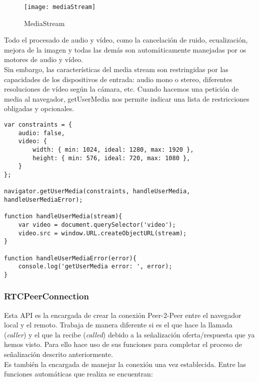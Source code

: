 \begin{figure}[htb]
\centering
\texttt{[image: mediaStream]}
\caption{MediaStream}
\label{fig:mediaStream}
\end{figure}

Todo el procesado de audio y vídeo, como la cancelación de ruido, ecualización, mejora de la imagen y todas las demás son automáticamente manejadas por os motores de audio y vídeo.\\

Sin embargo, las características del media stream son restringidas por las capacidades de los dispositivos de entrada: audio mono o stereo, diferentes resoluciones de vídeo según la cámara, etc. Cuando hacemos una petición de media al navegador, getUserMedia nos permite indicar una lista de restricciones obligadas y opcionales.\\

\begin{lstlisting}[caption=Llamada a función RTCPeerConnection]
var constraints = {
    audio: false,
    video: {
        width: { min: 1024, ideal: 1280, max: 1920 },
        height: { min: 576, ideal: 720, max: 1080 },
    }
};

navigator.getUserMedia(constraints, handleUserMedia, handleUserMediaError); 

function handleUserMedia(stream){
    var video = document.querySelector('video');
    video.src = window.URL.createObjectURL(stream);
}

function handleUserMediaError(error){
	console.log('getUserMedia error: ', error);
}

\end{lstlisting}

\subsubsection{RTCPeerConnection}

Esta API es la encargada de crear la conexión Peer-2-Peer entre el navegador local y el remoto. Trabaja de manera diferente si es el que hace la llamada (\textit{caller}) y el que la recibe (\textit{called}) debido a la señalización oferta/respuesta que ya hemos visto. Para ello hace uso de sus funciones para completar el proceso de señalización descrito anteriormente.\\

\noindent Es también la encargada de manejar la conexión una vez establecida. Entre las funciones automáticas que realiza se encuentran:\\

